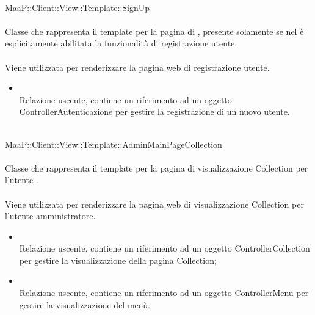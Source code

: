 \\
MaaP::Client::View::Template::SignUp\\
\\
Classe che rappresenta il template per la pagina di , presente solamente se nel  è esplicitamente abilitata la funzionalità di registrazione utente.\\
\\
Viene utilizzata per renderizzare la pagina web di registrazione utente.
\begin{itemize}
\item{}\\
Relazione uscente, contiene un riferimento ad un oggetto ControllerAutenticazione per gestire la registrazione di un nuovo utente.
\end{itemize}

\\
MaaP::Client::View::Template::AdminMainPageCollection\\
\\
Classe che rappresenta il template per la pagina di visualizzazione Collection per l'utente .\\
\\
Viene utilizzata per renderizzare la pagina web di visualizzazione Collection per l'utente amministratore.\\
\begin{itemize}
\item{}\\
Relazione uscente, contiene un riferimento ad un oggetto ControllerCollection per gestire la visualizzazione della pagina Collection;
\item{}\\
Relazione uscente, contiene un riferimento ad un oggetto ControllerMenu per gestire la visualizzazione del menù.
\end{itemize}

